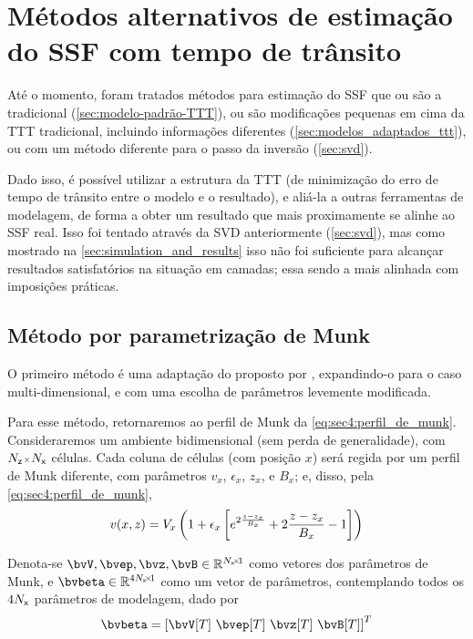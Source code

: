 \section{Métodos alternativos de estimação do SSF com tempo de trânsito}
\label{sec:modelos_alternativos_est-ssf}

Até o momento, foram tratados métodos para estimação do SSF que ou são a  tradicional (\cref{sec:modelo-padrão-TTT}), ou são modificações pequenas em cima da TTT tradicional, incluindo informações diferentes (\cref{sec:modelos_adaptados_ttt}), ou com um método diferente para o passo da inversão (\cref{sec:svd}).

Dado isso, é possível utilizar a estrutura da TTT (de minimização do erro de tempo de trânsito entre o modelo e o resultado), e aliá-la a outras ferramentas de modelagem, de forma a obter um resultado que mais proximamente se alinhe ao SSF real. Isso foi tentado através da SVD anteriormente (\cref{sec:svd}), mas como mostrado na \cref{sec:simulation_and_results} isso não foi suficiente para alcançar resultados satisfatórios na situação em camadas; essa sendo a mais alinhada com imposições práticas.

\subsection{Método por parametrização de Munk}
\label{subsec:sec4:metodo_parametrizado_por_munk}

O primeiro método é uma adaptação do proposto por \citet{wu_inversion_2023}, expandindo-o para o caso multi-dimensional, e com uma escolha de parâmetros levemente modificada.

Para esse método, retornaremos ao perfil de Munk da \cref{eq:sec4:perfil_de_munk}. Consideraremos um ambiente bidimensional (sem perda de generalidade), com $\sz{N_{\z}}{N_{\x}}$ células. Cada coluna de células (com posição $x$) será regida por um perfil de Munk diferente, com parâmetros $v_x$, $\epsilon_x$, $z_x$, e $B_x$; e, disso, pela \cref{eq:sec4:perfil_de_munk},
\begin{equation}
	v(x,z) = V_x \pts{ 1 + \epsilon_x \bts{ e^{2\frac{z-z_x}{B_x} } + 2\frac{z-z_x}{B_x} - 1 } }
	\label{eq:sec5:perfil_munk_parametrizado}
\end{equation}

Denota-se $\bvV,\bvep,\bvz,\bvB \in \re^{\sz{N_{\x}}{1}}$ como vetores dos parâmetros de Munk, e $\bvbeta \in \re^{\sz{4N_{\x}}{1}}$ como um vetor de parâmetros, contemplando todos os $4N_{{\textsf{x}}}$ parâmetros de modelagem, dado por
\begin{equation}
	\bvbeta = \tr{\bts{\bvV[T] ~ \bvep[T] ~ \bvz[T] ~ \bvB[T]}}
	\label{eq:sec5:definicao_vetor_bvbeta}
\end{equation}

